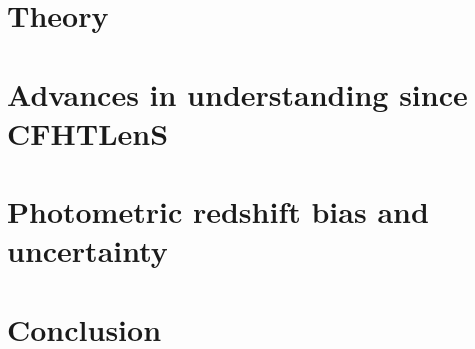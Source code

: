 \documentclass[a4paper, preprint, fleqn, usenatbib]{aastex}
\begin{document}
\section{Theory}
\label{sec:theory}


\section{Advances in understanding since CFHTLenS}
\label{sec:cfhtlens}


\section{Photometric redshift bias and uncertainty}
\label{sec:photoz}


\section{Conclusion}
\label{sec:conclusion}




\end{document}
